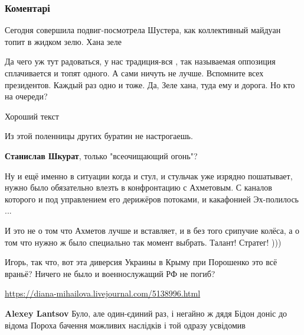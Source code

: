 
 
 
 
 
\subsubsection{Коментарі}
\label{sec:20_11_2021.fb.lesev_igor.1.po_vagnerovcam.cmt}

\begin{itemize} %
Сегодня совершила подвиг-посмотрела Шустера, как коллективный майдуан топит в жидком зелю. Хана зеле


Да чего уж тут радоваться, у нас традиция-вся , так называемая оппозиция
сплачивается и топят одного. А сами ничуть не лучше. Вспомните всех
президентов. Каждый раз одно и тоже. Да, Зеле хана, туда ему и дорога. Но кто на
очереди?


Хороший текст

Из этой поленницы других буратин не настрогаешь.

\textbf{Станислав Шкурат}, только "всеочищающий огонь"?


Ну и ещё именно в ситуации когда и стул, и стульчак уже изрядно пошатывает,
нужно было обязательно влезть в конфронтацию с Ахметовым. С каналов которого и
под управлением его дерижёров потоками, и какафонией Эх-полилось ...

И это не о том что Ахметов лучше и вставляет, и в без того срипучие колёса, а о
том что нужно ж было специально так момент выбрать. Талант! Стратег! )))


Игорь, так что, вот эта диверсия Украины в Крыму при Порошенко это всё враньё?
Ничего не было и военнослужащий РФ не погиб?

\url{https://diana-mihailova.livejournal.com/5138996.html}

\begin{itemize} %
\textbf{Alexey Lantsov} Було, але один-єдиний раз, і негайно ж дядя Бідон доніс до відома Пороха бачення можливих наслідків і той одразу усвідомив


\end{itemize}
\end{itemize}

